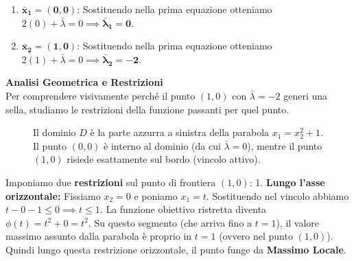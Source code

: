 \documentclass[12pt, a4paper]{article}
\begin{document}
	\begin{enumerate}
		\item $\mathbf{\bar{x}_1 = (0,0)}$: Sostituendo nella prima equazione otteniamo $2(0) + \bar{\lambda} = 0 \implies \mathbf{\bar{\lambda}_1 = 0}$. 
		\item $\mathbf{\bar{x}_2 = (1,0)}$: Sostituendo nella prima equazione otteniamo $2(1) + \bar{\lambda} = 0 \implies \mathbf{\bar{\lambda}_2 = -2}$.
	\end{enumerate}
	
	\textbf{Analisi Geometrica e Restrizioni}\\
	Per comprendere visivamente perché il punto $(1,0)$ con $\bar{\lambda} = -2$ generi una sella, studiamo le restrizioni della funzione passanti per quel punto.
	
	\begin{figure}[H]
		\centering
		\caption{Il dominio $D$ è la parte azzurra a sinistra della parabola $x_1 = x_2^2 + 1$. Il punto $(0,0)$ è interno al dominio (da cui $\bar{\lambda} = 0$), mentre il punto $(1,0)$ risiede esattamente sul bordo (vincolo attivo).}
	\end{figure}
	
	Imponiamo due \textbf{restrizioni} sul punto di frontiera $(1,0)$:
	1. \textbf{Lungo l'asse orizzontale:} Fissiamo $x_2 = 0$ e poniamo $x_1 = t$. Sostituendo nel vincolo abbiamo $t - 0 - 1 \le 0 \implies t \le 1$. La funzione obiettivo ristretta diventa $\phi(t) = t^2 + 0 = t^2$. Su questo segmento (che arriva fino a $t=1$), il valore massimo assunto dalla parabola è proprio in $t=1$ (ovvero nel punto $(1,0)$). Quindi lungo questa restrizione orizzontale, il punto funge da \textbf{Massimo Locale}.
	
\end{document}

